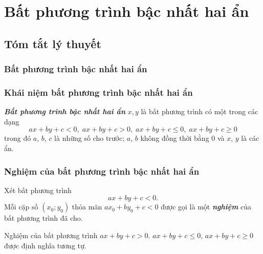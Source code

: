 \section{Bất phương trình bậc nhất hai ẩn}
\setcounter{dang}{0}
\subsection{Tóm tắt lý thuyết}
\subsubsection{Bất phương trình bậc nhất hai ẩn}
\subsubsection{Khái niệm bất phương trình bậc nhất hai ẩn}
\begin{boxdn}
	\textbf{\textit{Bất phương trình bậc nhất hai ẩn}} $x, y$ là bất phương trình có một trong các dạng
	$$ax+by+c<0,\; ax+by+c>0 ,\; ax+by+c \leq 0 ,\; a x+b y+c \geq 0$$
	trong đó $a$, $b$, $c$ là những số cho trước; $a$, $b$ không đồng thời bằng $0$ và $x$, $y$ là các ẩn.
\end{boxdn}
\subsubsection{Nghiệm của bất phương trình bậc nhất hai ẩn}
\begin{boxdn}
	Xét bất phương trình $$ax+by+c<0.$$
	Mỗi cặp số $(x_0;y_0)$ thỏa mãn $ax_0+by_0+c<0$ được gọi là một \textbf{\textit{nghiệm}} của bất phương trình đã cho.
\end{boxdn}
\begin{note}
	Nghiệm của bất phương trình $ax+by+c>0$. $ax+by+c \leq 0$, $ax+by+c \geq 0$ được định nghĩa tương tự.
\end{note}
